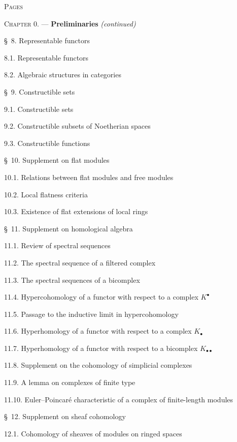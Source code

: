 \begin{flushleft}
\hfill\textsc{Pages}

\textsc{Chapter 0.} --- \textbf{Preliminaries} \textit{(continued)} 

\medskip
\S~8. Representable functors 

8.1. Representable functors 

8.2. Algebraic structures in categories 

\medskip
\S~9. Constructible sets 

9.1. Constructible sets 

9.2. Constructible subsets of Noetherian spaces 

9.3. Constructible functions 

\medskip
\S~10. Supplement on flat modules 

10.1. Relations between flat modules and free modules 

10.2. Local flatness criteria 

10.3. Existence of flat extensions of local rings 

\medskip
\S~11. Supplement on homological algebra 

11.1. Review of spectral sequences 

11.2. The spectral sequence of a filtered complex 

11.3. The spectral sequences of a bicomplex 

11.4. Hypercohomology of a functor with respect to a complex $K^\bullet$

11.5. Passage to the inductive limit in hypercohomology 

11.6. Hyperhomology of a functor with respect to a complex $K_\bullet$

11.7. Hyperhomology of a functor with respect to a bicomplex
$K_{\bullet\bullet}$ 

11.8. Supplement on the cohomology of simplicial complexes 

11.9. A lemma on complexes of finite type 

11.10. Euler--Poincaré characteristic of a complex of finite-length modules

\medskip
\S~12. Supplement on sheaf cohomology 

12.1. Cohomology of sheaves of modules on ringed spaces 


\end{flushleft}
